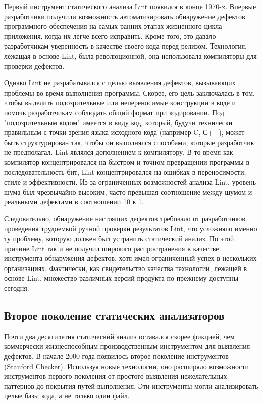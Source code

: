 Первый инструмент статического анализа Lint\cite{} появился в конце 1970-x. Впервые разработчики 
получили возможность автоматизировать обнаружение дефектов программного обеспечения на самых 
ранних этапах жизненного цикла приложения, когда их легче всего исправить. Кроме того, это 
давало разработчикам уверенность в качестве своего кода перед релизом. Технология, лежащая в 
основе Lint, была революционной, она использовала компиляторы для проверки дефектов. 

Однако Lint не разрабатывался с целью выявления дефектов, вызывающих проблемы во 
время выполнения программы. Скорее, его цель заключалась в том, чтобы выделить подозрительные 
или непереносимые конструкции в коде и помочь разработчикам соблюдать общий формат при 
кодировании. Под "подозрительным кодом" имеется в виду код, который, будучи технически правильным 
с точки зрения языка исходного кода (например C, С++), может быть структурирован так, чтобы он 
выполнялся способами, которые разработчик не предполагал. Lint являлся дополнением к компилятору. В то время как  компилятор концентрировался на быстром и точном превращении программы в последовательность бит, Lint концентрировался на ошибках в переносимости, стиле и эффективности.
Из-за ограниченных возможностей анализа Lint, уровень шума был чрезвычайно высоким, часто превышая соотношение между шумом и реальными дефектами в соотношении 10 к 1.

Следовательно, обнаружение настоящих дефектов требовало от разработчиков проведения трудоемкой 
ручной проверки результатов Lint, что усложняло именно ту проблему, которую должен был 
устранить статический анализ. По этой причине Lint так и не получил широкого распространения в 
качестве инструмента обнаружения дефектов, хотя имел ограниченный успех в нескольких 
организациях. Фактически, как свидетельство качества технологии, лежащей в основе Lint, 
множество различных версий продукта по-прежнему доступны сегодня. %

\subsection{Второе поколение статических анализаторов}
Почти два десятилетия статический анализ оставался скорее фикцией, чем коммерчески 
жизнеспособным производственным инструментом для выявления дефектов. В начале 2000 года
появилось второе поколение инструментов (Stanford Checker\cite{}). Используя новые 
технологии, оно расширяло возможности инструментов первого поколения от простого выявления 
нежелательных паттернов до покрытия путей выполнения. Эти инструменты могли анализировать 
целые базы кода, а не только один файл. 

